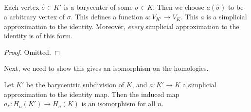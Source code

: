 \documentclass[a4paper]{article}
\begin{document}
\begin{lemma}
  Each vertex $\hat{\sigma} \in K'$ is a barycenter of some $\sigma \in K$. Then we choose $a(\hat{\sigma})$ to be a arbitrary vertex of $\sigma$. This defines a function $a: V_{K'} \to V_K$. This $a$ is a simplicial approximation to the identity. Moreover, \emph{every} simplicial approximation to the identity is of this form.
\end{lemma}

\begin{proof}
  Omitted. %
\end{proof}

Next, we need to show this gives an isomorphism on the homologies.

\begin{prop}
  Let $K'$ be the barycentric subdivision of $K$, and $a: K' \to K$ a simplicial approximation to the identity map. Then the induced map $a_*: H_n(K') \to H_n(K)$ is an isomorphism for all $n$.
\end{prop}
\end{document}
